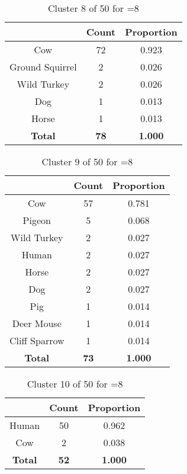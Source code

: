 \begin{table}[ht!]
\centering
\begin{tabular}{|c|c|c|}
\hline
\bf \Spec{} &\bf Count &\bf Proportion\\ \hline \hline
Cow & 72 & 0.923\\ \hline
Ground Squirrel & 2 & 0.026\\ \hline
Wild Turkey & 2 & 0.026\\ \hline
Dog & 1 & 0.013\\ \hline
Horse & 1 & 0.013\\ \hline
\hline
\bf Total & \bf 78 & \bf 1.000\\ \hline
\end{tabular}
\label{tab:cluster:8:8}
\caption{Cluster 8 of 50 for \minneigh{}=8}
\end{table}

\begin{table}[ht!]
\centering
\begin{tabular}{|c|c|c|}
\hline
\bf \Spec{} &\bf Count &\bf Proportion\\ \hline \hline
Cow & 57 & 0.781\\ \hline
Pigeon & 5 & 0.068\\ \hline
Wild Turkey & 2 & 0.027\\ \hline
Human & 2 & 0.027\\ \hline
Horse & 2 & 0.027\\ \hline
Dog & 2 & 0.027\\ \hline
Pig & 1 & 0.014\\ \hline
Deer Mouse & 1 & 0.014\\ \hline
Cliff Sparrow & 1 & 0.014\\ \hline
\hline
\bf Total & \bf 73 & \bf 1.000\\ \hline
\end{tabular}
\label{tab:cluster:9:8}
\caption{Cluster 9 of 50 for \minneigh{}=8}
\end{table}

\clearpage
\begin{table}[ht!]
\centering
\begin{tabular}{|c|c|c|}
\hline
\bf \Spec{} &\bf Count &\bf Proportion\\ \hline \hline
Human & 50 & 0.962\\ \hline
Cow & 2 & 0.038\\ \hline
\hline
\bf Total & \bf 52 & \bf 1.000\\ \hline
\end{tabular}
\label{tab:cluster:10:8}
\caption{Cluster 10 of 50 for \minneigh{}=8}
\end{table}

